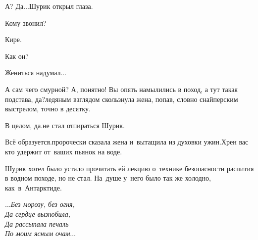 {	\diagdash А? Да$\ldots$\mdash Шурик открыл глаза.
	
	\diagdash Кому звонил?
	
	\diagdash Кире.
	
	\diagdash Как он? 
	
	\diagdash Жениться надумал$\ldots$ 
	
	\diagdash А сам чего смурной? А, понятно! Вы опять намылились в поход, а тут такая подстава, да?\mdash ледяным взглядом скользнула жена, попав, словно снайперским выстрелом, точно в десятку.%
	
	\diagdash В целом, да.\mdash не стал отпираться Шурик.
	
	\diagdash Всё образуется.\mdash пророчески сказала жена и~вытащила из духовки ужин.\mdash Хрен вас кто удержит от~ваших пьянок на воде.
	
	Шурик хотел было устало прочитать ей лекцию о~технике безопасности распития в водном походе, но не стал.  На~душе у~него было так же холодно, как~в~Антарктиде.%
	
	\vspace{0.5cm}
	\noindent\textit{%
		\hspace*{3.7cm}$\ldots$Без морозу, без огня,\\
		\hspace*{3.7cm}Да сердце вызнобила,\\
		\hspace*{3.7cm}Да рассыпала печаль\\
		\hspace*{3.7cm}По моим ясным очам$\ldots$
	}
	
}
